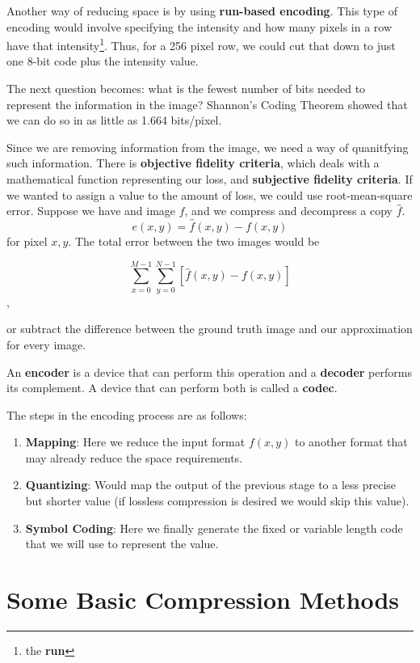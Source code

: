 \documentclass{tufte-handout}
\begin{document}
Another way of reducing space is by using \textbf{run-based encoding}. This type
of encoding would involve specifying the intensity and how many pixels in a row have
that intensity\footnote{the \textbf{run}}. Thus, for a 256 pixel row, we could cut that
down to just one 8-bit code plus the intensity value.

The next question becomes: what is the fewest number of bits needed to represent 
the information in the image? Shannon's Coding Theorem showed that we can do so 
in as little as 1.664 bits/pixel.

Since we are removing information from the image, we need a way of quanitfying such
information. There is \textbf{objective fidelity criteria}, which deals with 
a mathematical function representing our loss, and \textbf{subjective fidelity 
criteria}. If we wanted to assign a value to the amount of loss, we could use
root-mean-square error. Suppose we have and image $f$, and we compress and decompress
a copy $\hat{f}$.
\[e(x, y) = \hat{f}(x, y) - f(x, y)\]
for pixel $x, y$. The total error between the two images would be 

\[\sum_{x=0}^{M-1}\sum_{y=0}^{N-1}[\hat{f}(x, y) - f(x, y)]\], 

or subtract the difference between the ground truth image and our approximation
for every image.

An \textbf{encoder} is a device that can perform this operation and a \textbf{decoder}
performs its complement. A device that can perform both is called a \textbf{codec}.

The steps in the encoding process are as follows:
\begin{enumerate}
	\item\textbf{Mapping}: Here we reduce the input format $f(x,y)$ to another format
			that may already reduce the space requirements.
	\item\textbf{Quantizing}: Would map the output of the previous stage to a less
			precise but shorter value (if lossless compression is desired we would
			skip this value).
	\item\textbf{Symbol Coding}: Here we finally generate the fixed or variable 
			length code that we will use to represent the value.
\end{enumerate}

\section{Some Basic Compression Methods}
\end{document}
